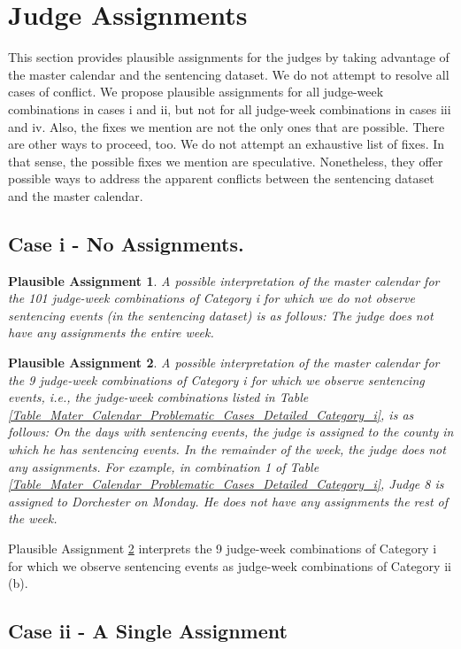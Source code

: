 \documentclass[11pt, oneside]{article}   	%
\theoremstyle{ModifiedStyle}
\newtheorem{plausible_assignment}{Plausible Assignment}
\begin{document}
\section{Judge Assignments}
\label{Sec:Appendix:Master_Calendar_Interpretations}
This section provides plausible assignments for the judges by taking advantage of the master calendar and the sentencing dataset. We do not attempt to resolve all cases of conflict. We propose plausible assignments for all judge-week combinations in cases i and ii, but not for all judge-week combinations in cases iii and iv. Also, the fixes we mention are not the only ones that are possible. There are other ways to proceed, too. We do not attempt an exhaustive list of fixes. In that sense, the possible fixes we mention are speculative. Nonetheless, they offer possible ways to address the apparent conflicts between the sentencing dataset and the master calendar.
%
\subsection{Case i - No Assignments.}
%
\begin{plausible_assignment}
	A possible interpretation of the master calendar for the 101 judge-week combinations of Category i for which we do not observe sentencing events (in the sentencing dataset) is as follows: The judge does not have any assignments the entire week.
\end{plausible_assignment}
%
\begin{plausible_assignment}
	A possible interpretation of the master calendar for the 9 judge-week combinations of Category i for which we observe sentencing events, i.e., the judge-week combinations listed in Table \ref{Table_Mater_Calendar_Problematic_Cases_Detailed_Category_i}, is as follows: On the days with sentencing events, the judge is assigned to the county in which he has sentencing events. In the remainder of the week, the judge does not any assignments. For example, in combination 1 of Table \ref{Table_Mater_Calendar_Problematic_Cases_Detailed_Category_i}, Judge 8 is assigned to Dorchester on Monday. He does not have any assignments the rest of the week.
	\label{Plausible_Assignment_Category_i_9Problematic}
\end{plausible_assignment}
%
Plausible Assignment \ref{Plausible_Assignment_Category_i_9Problematic} interprets the 9 judge-week combinations of Category i for which we observe sentencing events as judge-week combinations of Category ii (b).
%
\subsection{Case ii - A Single Assignment}
\end{document}
